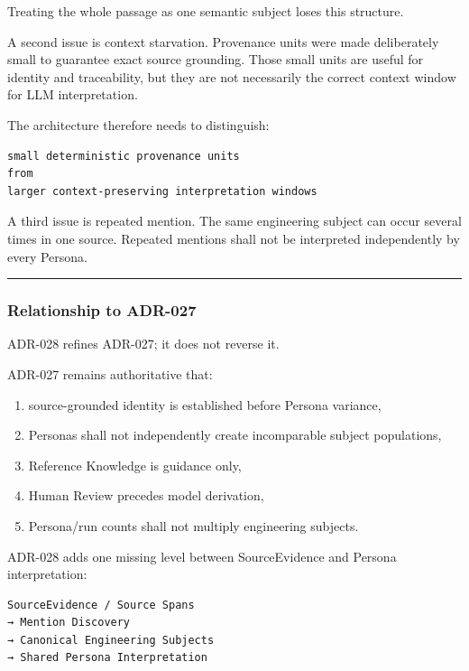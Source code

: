 Treating the whole passage as one semantic subject loses this structure.

A second issue is context starvation. Provenance units were made deliberately small to guarantee exact source grounding. Those small units are useful for identity and traceability, but they are not necessarily the correct context window for LLM interpretation.

The architecture therefore needs to distinguish:

\begin{verbatim}
small deterministic provenance units
from
larger context-preserving interpretation windows
\end{verbatim}

A third issue is repeated mention. The same engineering subject can occur several times in one source. Repeated mentions shall not be interpreted independently by every Persona.

\begin{center}\rule{0.5\linewidth}{0.5pt}\end{center}

\hypertarget{relationship-to-adr-027}{%
\subsubsection{Relationship to ADR-027}\label{relationship-to-adr-027}}

ADR-028 refines ADR-027; it does not reverse it.

ADR-027 remains authoritative that:

\begin{enumerate}
\def\labelenumi{\arabic{enumi}.}
\tightlist
\item
  source-grounded identity is established before Persona variance,
\item
  Personas shall not independently create incomparable subject populations,
\item
  Reference Knowledge is guidance only,
\item
  Human Review precedes model derivation,
\item
  Persona/run counts shall not multiply engineering subjects.
\end{enumerate}

ADR-028 adds one missing level between SourceEvidence and Persona interpretation:

\begin{verbatim}
SourceEvidence / Source Spans
→ Mention Discovery
→ Canonical Engineering Subjects
→ Shared Persona Interpretation
\end{verbatim}

